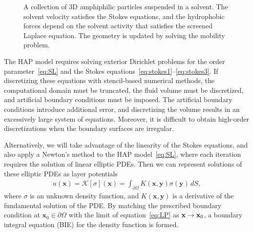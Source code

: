 \label{subsec:specific_aim_2}
\begin{figure}
    \vspace{-15pt}
    \caption{\label{fig:flow_map} \footnotesize A collection of 3D
    amphiphilic particles suspended in a solvent. The solvent velocity
    satisfies the Stokes equations, and the hydrophobic forces depend on
    the solvent activity that satisfies the screened Laplace equation.
    The geometry is updated by solving the mobility problem.} 
\end{figure}
The HAP model requires solving exterior Dirichlet problems for the order
parameter~\eqref{eq:SL} and the Stokes
equations~\eqref{eq:stokes1}--\eqref{eq:stokes3}. If discretizing these
equations with stencil-based numerical methods, the computational domain
must be truncated, the fluid volume must be discretized, and artificial
boundary conditions must be imposed. The artificial boundary conditions
introduce additional error, and discretizing the volume results in an
excessively large system of equations. Moreover, it is difficult to
obtain high-order discretizations when the boundary surfaces are
irregular. 

Alternatively, we will take advantage of the linearity of the Stokes
equations, and also apply a Newton's method to the HAP
model~\eqref{eq:SL}, where each iteration requires the solution of
linear elliptic PDEs. Then we can represent solutions of these elliptic
PDEs as layer potentials
\begin{align}
  \label{eq:LP}
  u(\mathbf{x}) = \mathcal{K}[\sigma](\mathbf{x}) = 
  \int_{\partial\Omega} K(\mathbf{x},\mathbf{y})
  \sigma(\mathbf{y})\,dS,
\end{align}
where $\sigma$ is an unknown density function, and
$K(\mathbf{x},\mathbf{y})$ is a derivative of the fundamental solution
of the PDE. By matching the prescribed boundary condition at
$\mathbf{x}_0 \in \partial\Omega$ with the limit of
equation~\eqref{eq:LP} as $\mathbf{x} \rightarrow \mathbf{x}_0$, a boundary integral
equation (BIE) for the density function is formed. 

